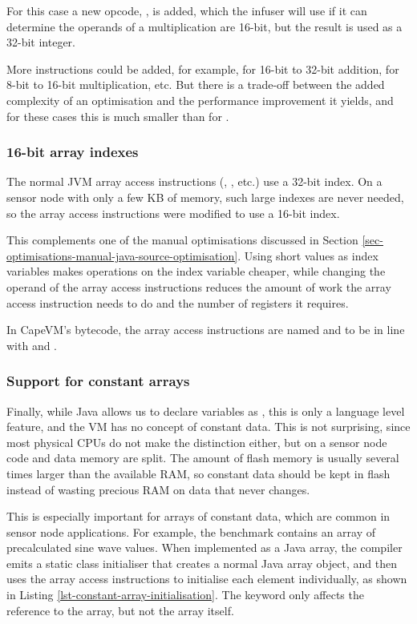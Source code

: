 For this case a new opcode, , is added, which the infuser will use if it can determine the operands of a multiplication are 16-bit, but the result is used as a 32-bit integer.

More instructions could be added, for example,  for 16-bit to 32-bit addition,  for 8-bit to 16-bit multiplication, etc. But there is a trade-off between the added complexity of an optimisation and the performance improvement it yields, and for these cases this is much smaller than for .

\subsubsection{16-bit array indexes}
The normal JVM array access instructions (, , etc.) use a 32-bit index. On a sensor node with only a few KB of memory, such large indexes are never needed, so the array access instructions were modified to use a 16-bit index. 

This complements one of the manual optimisations discussed in Section \ref{sec-optimisations-manual-java-source-optimisation}. Using short values as index variables makes operations on the index variable cheaper, while changing the operand of the array access instructions reduces the amount of work the array access instruction needs to do and the number of registers it requires.

In CapeVM's bytecode, the array access instructions are named  and  to be in line with  and .

\subsubsection{Support for constant arrays}
\label{sec-opt-constant-arrays}
Finally, while Java allows us to declare variables as , this is only a language level feature, and the VM has no concept of constant data. This is not surprising, since most physical CPUs do not make the distinction either, but on a sensor node code and data memory are split. The amount of flash memory is usually several times larger than the available RAM, so constant data should be kept in flash instead of wasting precious RAM on data that never changes.

This is especially important for arrays of constant data, which are common in sensor node applications. For example, the  benchmark contains an array of precalculated sine wave values. When implemented as a  Java array, the compiler emits a static class initialiser that creates a normal Java array object, and then uses the array access instructions to initialise each element individually, as shown in Listing \ref{lst-constant-array-initialisation}. The  keyword only affects the reference to the  array, but not the array itself.

